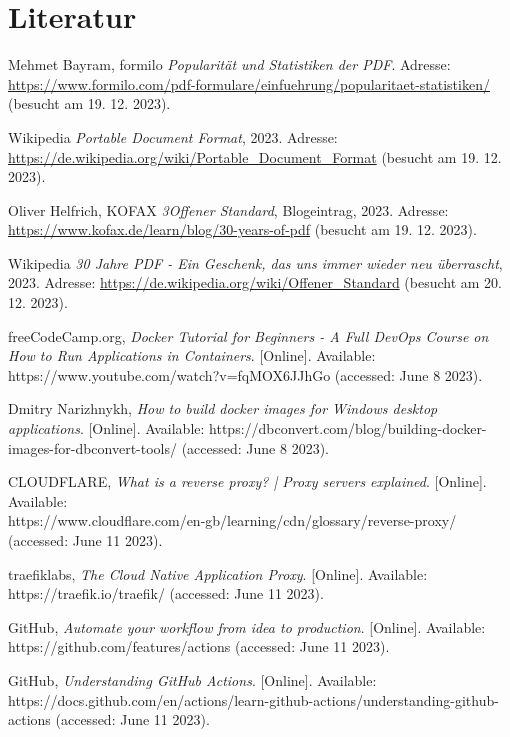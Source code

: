 \chapter*{Literatur}
\label{chap:literature}
%
\begin{referenceslist}
	\item Mehmet Bayram, formilo \emph{Popularität und Statistiken der PDF}. Adresse: \url{https://www.formilo.com/pdf-formulare/einfuehrung/popularitaet-statistiken/} (besucht am 19. 12. 2023).
	
	\itema Wikipedia \emph{Portable Document Format}, 2023. Adresse: \url{https://de.wikipedia.org/wiki/Portable_Document_Format} (besucht am 19. 12. 2023).
	
	\itemb Oliver Helfrich, KOFAX \emph{3Offener Standard}, Blogeintrag, 2023. Adresse: \url{https://www.kofax.de/learn/blog/30-years-of-pdf} (besucht am 19. 12. 2023).
	
	\itemc Wikipedia \emph{30 Jahre PDF - Ein Geschenk, das uns immer wieder neu überrascht}, 2023. Adresse: \url{https://de.wikipedia.org/wiki/Offener_Standard} (besucht am 20. 12. 2023).
	
	\itemd freeCodeCamp.org, \emph{Docker Tutorial for Beginners - A Full DevOps Course on How to Run Applications in Containers}. [Online]. Available: \\ 
	https://www.youtube.com/watch?v=fqMOX6JJhGo (accessed: June 8 2023). 
	
	\iteme Dmitry Narizhnykh, \emph{How to build docker images for Windows desktop applications}. [Online]. Available: https://dbconvert.com/blog/building-docker-images-for-dbconvert-tools/ (accessed: June 8 2023).
	
	\itemf CLOUDFLARE, \emph{What is a reverse proxy? | Proxy servers explained}. [Online]. Available: \\
	https://www.cloudflare.com/en-gb/learning/cdn/glossary/reverse-proxy/  (accessed: June 11 2023).
	
	\itemg traefiklabs, \emph{The Cloud Native Application Proxy}. [Online]. Available: \\
	https://traefik.io/traefik/  (accessed: June 11 2023). 
	
	\itemh GitHub, \emph{Automate your workflow from idea to production}. [Online]. Available: \\
	https://github.com/features/actions (accessed: June 11 2023).
	
	\itemi GitHub, \emph{Understanding GitHub Actions}. [Online]. Available: \\
	https://docs.github.com/en/actions/learn-github-actions/understanding-github-actions  (accessed: June 11 2023).
	

\end{referenceslist}

